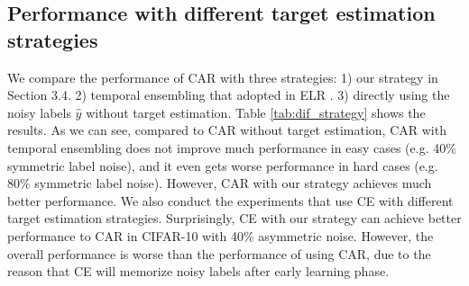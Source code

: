 \documentclass{article}
\begin{document}
\subsection{Performance with different target estimation strategies}
\label{apd:dif_stra}
We compare the performance of CAR with three strategies: 1) our strategy in Section 3.4. 2) temporal ensembling \cite{laine2016temporal} that adopted in ELR \cite{liu2020early}. 3) directly using the noisy labels $\hat{y}$ without target estimation. Table \ref{tab:dif_strategy} shows the results. As we can see, compared to CAR without target estimation, CAR with temporal ensembling does not improve much performance in easy cases (e.g. 40\% symmetric label noise), and it even gets worse performance in hard cases (e.g. 80\% symmetric label noise). However, CAR with our strategy achieves much better performance. We also conduct the experiments that use CE with different target estimation strategies. Surprisingly, CE with our strategy can achieve better performance to CAR in CIFAR-10 with 40\% asymmetric noise. However, the overall performance is worse than the performance of using CAR, due to the reason that CE will memorize noisy labels after early learning phase.
\end{document}
